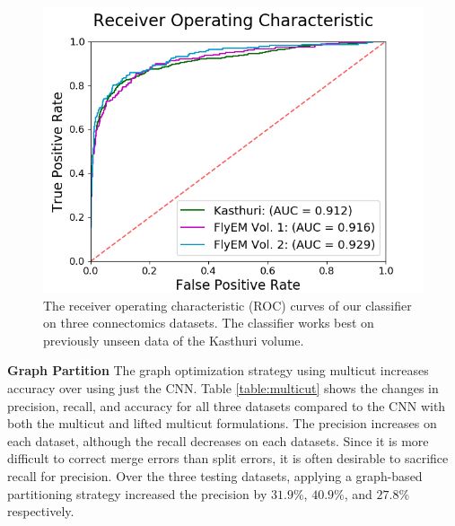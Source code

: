 \begin{figure}
	\centering
	\includegraphics[width=0.9\linewidth]{./figures/receiver-operating-characteristic.png}
	\caption{The receiver operating characteristic (ROC) curves of our classifier on three connectomics datasets. The classifier works best on previously unseen data of the Kasthuri volume.}
	\label{fig:receiver-operating-characteristic}
\end{figure}

\noindent\textbf{Graph Partition}
The graph optimization strategy using multicut increases accuracy over using just the CNN.
Table \ref{table:multicut} shows the changes in precision, recall, and accuracy for all three datasets compared to the CNN with both the multicut and lifted multicut formulations.
The precision increases on each dataset, although the recall decreases on each datasets.
Since it is more difficult to correct merge errors than split errors, it is often desirable to sacrifice recall for precision.
Over the three testing datasets, applying a graph-based partitioning strategy increased the precision by $31.9\%$, $40.9\%$, and $27.8\%$ respectively. 

